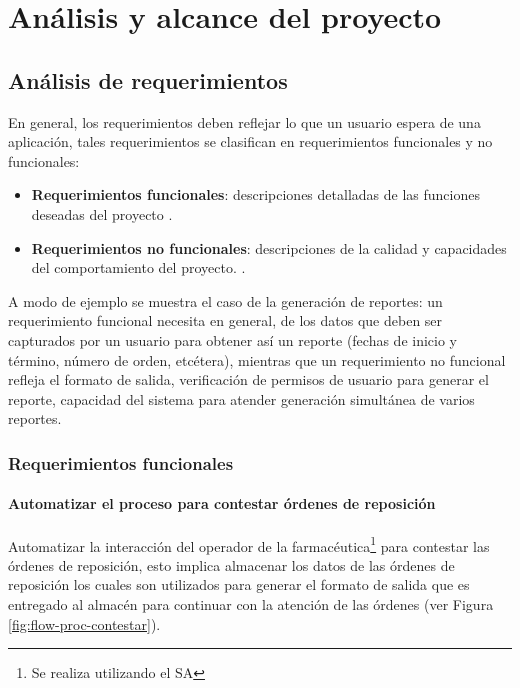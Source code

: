 \chapter{Análisis y alcance del proyecto}\label{cap2}




\section{Análisis de requerimientos}
En general, los requerimientos deben reflejar lo que un usuario espera de una aplicación, tales requerimientos se clasifican en requerimientos funcionales y no funcionales:
\begin{itemize}
\item \textbf{Requerimientos funcionales}: descripciones detalladas de las funciones deseadas del proyecto \cite{WileyBegSE}.
\item \textbf{Requerimientos no funcionales}: descripciones de la calidad y capacidades del comportamiento del proyecto. \cite{WileyBegSE}.
\end{itemize}
A modo de ejemplo se muestra el caso de la generación de reportes: un requerimiento funcional necesita en general, de los datos que deben ser capturados por un usuario para obtener así un reporte (fechas de inicio y término, número de orden, etcétera), mientras que un requerimiento no funcional refleja el formato de salida, verificación de permisos de usuario para generar el reporte,  capacidad del sistema para atender generación simultánea de varios reportes.


\subsection{Requerimientos funcionales}
\subsubsection{Automatizar el proceso para contestar órdenes de reposición}
Automatizar la interacción del operador de la farmacéutica\footnote{Se realiza utilizando el SA} para contestar las órdenes de reposición, esto implica almacenar los datos de las órdenes de reposición los cuales son utilizados para generar el formato de salida que es entregado al almacén para continuar con la atención de las órdenes (ver Figura \ref{fig:flow-proc-contestar}).

